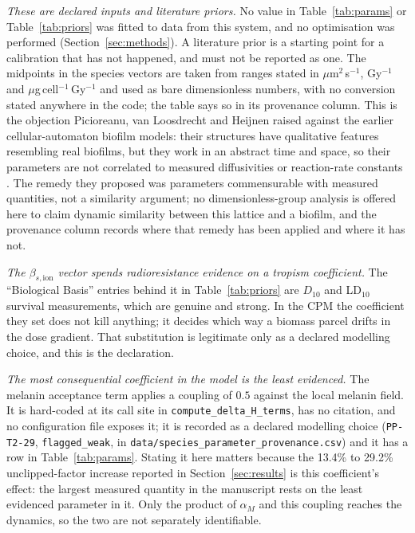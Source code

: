 \documentclass[11pt]{article}
\begin{document}
\emph{These are declared inputs and literature priors.} No value in Table~\ref{tab:params} or
Table~\ref{tab:priors} was fitted to data from this system, and no optimisation was performed
(Section~\ref{sec:methods}). A literature prior is a starting point for a calibration that has not
happened, and must not be reported as one. The midpoints in the species vectors are taken from
ranges stated in $\mu$m$^2$\,s$^{-1}$, Gy$^{-1}$ and $\mu$g\,cell$^{-1}$\,Gy$^{-1}$ and used as bare
dimensionless numbers, with no conversion stated anywhere in the code; the table says so in its
provenance column. This is the objection Picioreanu, van Loosdrecht and Heijnen raised against the
earlier cellular-automaton biofilm models: their structures have qualitative features resembling
real biofilms, but they work in an abstract time and space, so their parameters are not correlated
to measured diffusivities or reaction-rate constants \cite{picioreanu1999}. The remedy they proposed
was parameters commensurable with measured quantities, not a similarity argument; no
dimensionless-group analysis is offered here to claim dynamic similarity between this lattice and a
biofilm, and the provenance column records where that remedy has been applied and where it has not.

\emph{The $\beta_{s,\mathrm{ion}}$ vector spends radioresistance evidence on a tropism
coefficient.} The ``Biological Basis'' entries behind it in Table~\ref{tab:priors} are $D_{10}$ and
LD$_{10}$ survival measurements, which are genuine and strong. In the CPM the coefficient they set
does not kill anything; it decides which way a biomass parcel drifts in the dose gradient. That
substitution is legitimate only as a declared modelling choice, and this is the declaration.

\emph{The most consequential coefficient in the model is the least evidenced.} The melanin
acceptance term applies a coupling of $0.5$ against the local melanin field. It is hard-coded at its
call site in \texttt{compute\_delta\_H\_terms}, has no citation, and no configuration file exposes
it; it is recorded as a declared modelling choice (\texttt{PP-T2-29}, \texttt{flagged\_weak}, in
\texttt{data/species\_parameter\_provenance.csv}) and it has a row in Table~\ref{tab:params}.
Stating it here matters because the 13.4\% to 29.2\% unclipped-factor increase reported in
Section~\ref{sec:results} is this coefficient's effect: the largest measured quantity in the
manuscript rests on the least evidenced parameter in it. Only the product of $\alpha_M$ and this
coupling reaches the dynamics, so the two are not separately identifiable.
\end{document}
